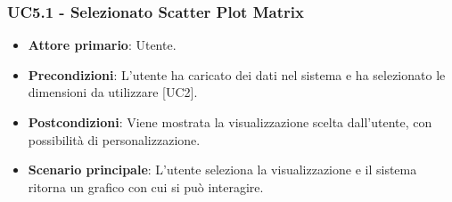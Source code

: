 \subsubsection{UC5.1 - Selezionato Scatter Plot Matrix}
\begin{itemize}
	\item \textbf{Attore primario}: Utente.
	\item \textbf{Precondizioni}: L'utente ha caricato dei dati nel sistema e ha selezionato le dimensioni da utilizzare [UC2].
	\item \textbf{Postcondizioni}: Viene mostrata la visualizzazione  scelta dall'utente, con possibilità di personalizzazione.
	\item \textbf{Scenario principale}: L'utente seleziona la visualizzazione  e il sistema ritorna un grafico con cui si può interagire.
\end{itemize}